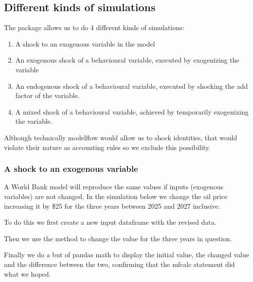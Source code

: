 \documentclass[letterpaper,10pt,english]{jupyterBook}
\begin{document}
\subsection{Different kinds of simulations}
\label{\detokenize{content/06_WBModels/LoadingWBModel:different-kinds-of-simulations}}
\sphinxAtStartPar
The  package allows us to do 4 different kinds of simulations:
\begin{enumerate}
%
\item {} 
\sphinxAtStartPar
A shock to an exogenous variable in the model

\item {} 
\sphinxAtStartPar
An exogenous shock of a behavioural variable, executed by exogenizing the variable

\item {} 
\sphinxAtStartPar
An endogenous shock of a behavioural variable, executed by shocking the add factor of the variable.

\item {} 
\sphinxAtStartPar
A mixed shock of a behavioural variable, achieved by temporarily exogenixing the variable.

\end{enumerate}

\sphinxAtStartPar
Although technically modelflow would allow us to shock identities, that would violate their nature as accounting rules so we exclude this possibility.


\subsubsection{A shock to an exogenous variable}
\label{\detokenize{content/06_WBModels/LoadingWBModel:a-shock-to-an-exogenous-variable}}
\sphinxAtStartPar
A World Bank model will reproduce the same values if inputs (exogenous variables) are not changed.  In the simulation below we change the oil price increasing it by \$25 for the three years between 2025 and 2027 inclusive.

\sphinxAtStartPar
To do this we first create a new input dataframe with the revised data.

\sphinxAtStartPar
Then we use the  method to change the value for the three years in question.

\sphinxAtStartPar
Finally we do a but of pandas math to display the initial value, the changed value and the difference between the two, confirming that the mfcalc statement did what we hoped.
\end{document}
